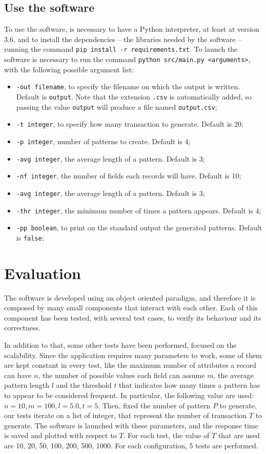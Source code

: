 \documentclass{acm_proc_article-sp-sigmod09}
\begin{document}
\subsection{Use the software}
To use the software, is necessary to have a Python interpreter, at least at version 3.6, and to install the dependencies -- the libraries needed by the software -- running the command \texttt{pip install -r requirements.txt}. To launch the software is necessary to run the command \texttt{python src/main.py <arguments>}, with the following possible argument list:
\begin{itemize}
\item \texttt{-out filename}, to specify the filename on which the output is written. Default is \texttt{output}. Note that the extension \texttt{.csv} is automatically added, so passing the value \texttt{output} will produce a file named \texttt{output.csv};
\item \texttt{-t integer}, to specify how many transaction to generate. Default is 20;
\item \texttt{-p integer}, number of patterns to create. Default is 4;
\item \texttt{-avg integer}, the average length of a pattern. Default is 3;
\item \texttt{-nf integer}, the number of fields each records will have. Default is 10;
\item \texttt{-avg integer}, the average length of a pattern. Default is 3;
\item \texttt{-thr integer}, the minimum number of times a pattern appears. Default is 4;
\item \texttt{-pp boolean}, to print on the standard output the generated patterns. Default is \texttt{false};
\end{itemize}

\section{Evaluation}
The software is developed using an object oriented paradigm, and therefore it is composed by many small components that interact with each other. Each of this component has been tested, with several test cases, to verify its behaviour and its correctness.

In addition to that, some other tests have been performed, focused on the scalability. Since the application requires many parameters to work, some of them are kept constant in every test, like the maximum number of attributes a record can have $n$, the number of possible values each field can assume $m$, the average pattern length $l$ and the threshold $t$ that indicates how many times a pattern has to appear to be considered frequent. In particular, the following value are used: $n = 10, m = 100, l = 5.0, t = 5$. Then, fixed the number of pattern $P$ to generate, our tests iterate on a list of integer, that represent the number of transaction $T$ to generate. The software is launched with these parameters, and the response time is saved and plotted with respect to $T$. For each test, the value of $T$ that are used are 10, 20, 50, 100, 200, 500, 1000. For each configuration, 5 tests are performed.
\end{document}
